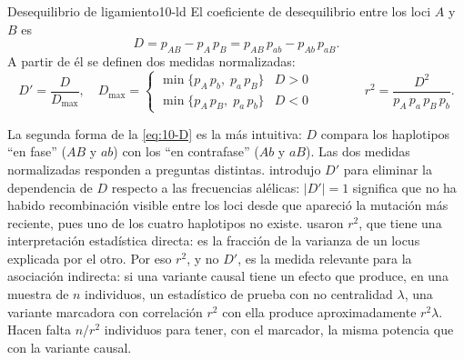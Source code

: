 \begin{definicion}{Desequilibrio de ligamiento}{10-ld}
El coeficiente de desequilibrio entre los loci $A$ y $B$ es
\begin{equation}\label{eq:10-D}
D = p_{AB} - p_A\,p_B = p_{AB}\,p_{ab} - p_{Ab}\,p_{aB}.
\end{equation}
A partir de él se definen dos medidas normalizadas:
\begin{equation}\label{eq:10-Dprima}
D' = \frac{D}{D_{\max}},\quad
D_{\max}=\begin{cases}\min\{p_A\,p_b,\; p_a\,p_B\} & D>0\\ \min\{p_A\,p_B,\; p_a\,p_b\} & D<0\end{cases}
\qquad\qquad
r^2 = \frac{D^2}{p_A\,p_a\,p_B\,p_b}.
\end{equation}
\end{definicion}

\begin{simbolos}
\end{simbolos}

La segunda forma de la \cref{eq:10-D} es la más intuitiva: $D$ compara los haplotipos ``en fase'' ($AB$ y $ab$) con los ``en contrafase'' ($Ab$ y $aB$). Las dos medidas normalizadas responden a preguntas distintas. \textcite{c10-lewontin1964} introdujo $D'$ para eliminar la dependencia de $D$ respecto a las frecuencias alélicas: $|D'|=1$ significa que no ha habido recombinación visible entre los loci desde que apareció la mutación más reciente, pues uno de los cuatro haplotipos no existe. \textcite{c10-hill1968} usaron $r^2$, que tiene una interpretación estadística directa: es la fracción de la varianza de un locus explicada por el otro. Por eso $r^2$, y no $D'$, es la medida relevante para la asociación indirecta: si una variante causal tiene un efecto que produce, en una muestra de $n$ individuos, un estadístico de prueba con no centralidad $\lambda$, una variante marcadora con correlación $r^2$ con ella produce aproximadamente $r^2\lambda$. Hacen falta $n/r^2$ individuos para tener, con el marcador, la misma potencia que con la variante causal.

